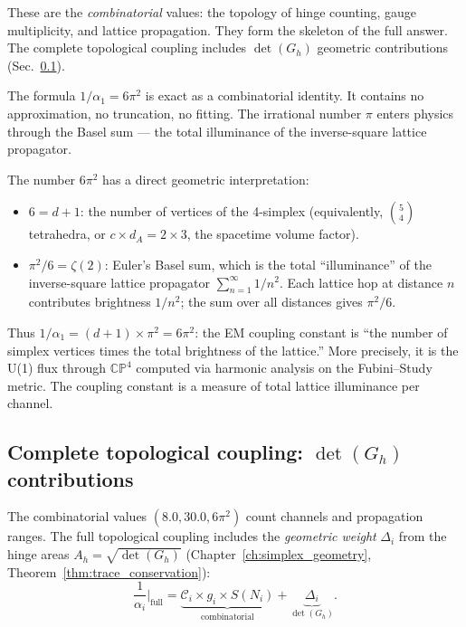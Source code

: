 These are the \emph{combinatorial} values: the topology of hinge counting, gauge multiplicity, and lattice propagation. They form the skeleton of the full answer. The complete topological coupling includes $\det(G_h)$ geometric contributions (Sec.~\ref{sec:det_contributions}).

\begin{remark}
The formula $1/\alpha_1 = 6\pi^2$ is exact as a combinatorial identity. It contains no approximation, no truncation, no fitting. The irrational number $\pi$ enters physics through the Basel sum --- the total illuminance of the inverse-square lattice propagator.
\end{remark}

\begin{remark}
The number $6\pi^2$ has a direct geometric interpretation:
\begin{itemize}
\item $6 = d + 1$: the number of vertices of the 4-simplex (equivalently, $\binom{5}{4}$ tetrahedra, or $c \times d_A = 2 \times 3$, the spacetime volume factor).
\item $\pi^2/6 = \zeta(2)$: Euler's Basel sum, which is the total ``illuminance'' of the inverse-square lattice propagator $\sum_{n=1}^\infty 1/n^2$. Each lattice hop at distance $n$ contributes brightness $1/n^2$; the sum over all distances gives $\pi^2/6$.
\end{itemize}
Thus $1/\alpha_1 = (d+1) \times \pi^2 = 6\pi^2$: the EM coupling constant is ``the number of simplex vertices times the total brightness of the lattice.'' More precisely, it is the U(1) flux through $\mathbb{CP}^4$ computed via harmonic analysis on the Fubini--Study metric. The coupling constant is a measure of total lattice illuminance per channel.
\end{remark}

\subsection{Complete topological coupling: $\det(G_h)$ contributions}
\label{sec:det_contributions}

The combinatorial values $(8.0, 30.0, 6\pi^2)$ count channels and propagation ranges. The full topological coupling includes the \emph{geometric weight} $\Delta_i$ from the hinge areas $A_h = \sqrt{\det(G_h)}$ (Chapter~\ref{ch:simplex_geometry}, Theorem~\ref{thm:trace_conservation}):
\begin{equation}
\frac{1}{\alpha_i}\bigg|_\text{full} = \underbrace{\mathcal{C}_i \times g_i \times S(N_i)}_{\text{combinatorial}} + \underbrace{\Delta_i}_{\det(G_h)}.
\end{equation}

